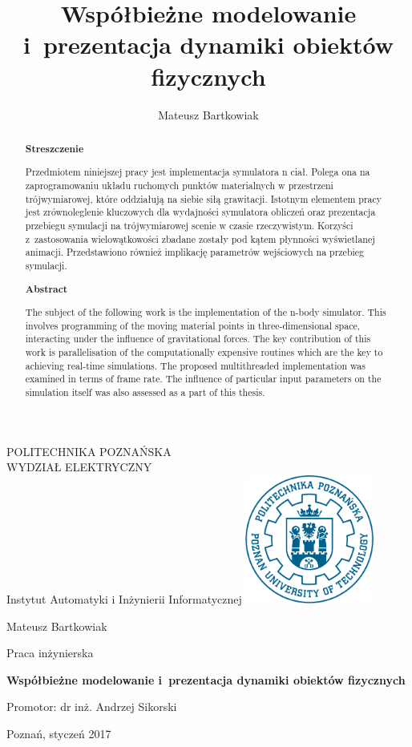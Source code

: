 \documentclass[12pt, twoside, openany]{report}
\author{Mateusz Bartkowiak}
\title{Współbieżne modelowanie i~prezentacja dynamiki obiektów fizycznych}
\begin{document}
\begin{titlepage}

\noindent


\centering
\Large POLITECHNIKA POZNAŃSKA\\
\large WYDZIAŁ ELEKTRYCZNY\\
Instytut Automatyki i Inżynierii Informatycznej
\vfill
\includegraphics[width=120pt,height=120pt]{PP}

\vfill
\center
\LARGE
Mateusz Bartkowiak

\center
\Large
Praca inżynierska

\vfill
\center
\Huge
\textbf{Współbieżne modelowanie i~prezentacja dynamiki obiektów fizycznych}


\vfill
\center
\Large
Promotor: dr inż. Andrzej Sikorski

\vfill
\center
\large
Poznań, styczeń 2017

\end{titlepage}

\renewcommand{\abstractname}{}
\begin{abstract}
\thispagestyle{plain} %
\begin{center}
\textbf{Streszczenie}
\end{center}

\indent Przedmiotem niniejszej pracy jest implementacja symulatora n ciał. Polega ona na zaprogramowaniu układu ruchomych punktów materialnych w przestrzeni trójwymiarowej, które oddziałują na siebie siłą grawitacji. Istotnym elementem pracy jest zrównoleglenie kluczowych dla wydajności symulatora obliczeń oraz prezentacja przebiegu symulacji na trójwymiarowej scenie w czasie rzeczywistym. Korzyści z~zastosowania wielowątkowości zbadane zostały pod kątem płynności wyświetlanej animacji. Przedstawiono również implikację parametrów wejściowych na przebieg symulacji.

\vspace{50px}
\begin{center}
\textbf{Abstract}
\end{center}

\indent
The subject of the following work is the implementation of the n-body simulator. This involves programming of the moving material points in three-dimensional space, interacting under the influence of gravitational forces. The key contribution of this work is parallelisation of the computationally expensive routines which are the key to achieving real-time simulations. The proposed multithreaded implementation was examined in terms of frame rate. The influence of particular input parameters on the simulation itself was also assessed as a part of this thesis.

\end{abstract}
\end{document}
